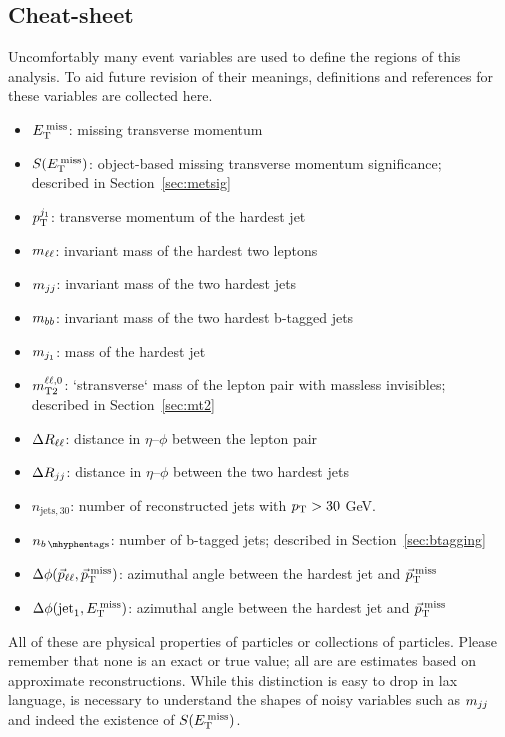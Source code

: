 \subsection{Cheat-sheet}
Uncomfortably many event variables are used to define the regions of this
analysis.
To aid future revision of their meanings, definitions and references for these
variables are collected here.
\begin{itemize}
\item $E_\mathrm{T}^\mathrm{\:miss}$: missing transverse momentum
\item $S(E_\mathrm{T}^\mathrm{\:miss})$: object-based missing transverse momentum significance;\\
described in Section~\ref{sec:metsig}
\item $p_\mathrm{T}^{j_1}$: transverse momentum of the hardest jet%
\vspace{0.5em}
\item $m_{\ell\ell}$: invariant mass of the hardest two leptons
\item $m_{jj}$: invariant mass of the two hardest jets
\item $m_{bb}$: invariant mass of the two hardest b-tagged jets
\item $m_{j_1}$: mass of the hardest jet
\item $m_\mathrm{T2}^{\ell\ell,0}$: `stransverse` mass of the lepton pair with massless invisibles;\\
described in Section~\ref{sec:mt2}
\vspace{0.5em}
\item $\Delta R_{\ell\ell}$: distance in $\eta\textrm{--}\phi$ between the lepton pair
\item $\Delta R_{jj}$: distance in $\eta\textrm{--}\phi$ between the two hardest jets%
\vspace{0.5em}
\item $n_{\mathrm{jets},30}$: number of reconstructed jets with $p_\mathrm{T} > 30$ GeV.
\item $\nbtag$: number of b-tagged jets;
described in Section~\ref{sec:btagging}
\vspace{0.5em}
\item $\Delta\phi(\vec p_{\ell\ell}, \vec p_\mathrm{T}^\mathrm{\:miss})$: azimuthal angle between the hardest jet and $\vec p_\mathrm{T}^\mathrm{\:miss}$
\item $\Delta\phi(\mathrm{jet}_1,E_\mathrm{T}^\mathrm{\:miss})$: azimuthal angle between
the hardest jet and $\vec p_\mathrm{T}^\mathrm{\:miss}$
\end{itemize}
All of these are physical properties of particles or collections of particles.
Please remember that none is an exact or true value;
all are are estimates based on approximate reconstructions.
While this distinction is easy to drop in lax language, is necessary to
understand the shapes of noisy variables such as $m_{jj}$ and indeed the
existence of $S(E_\mathrm{T}^\mathrm{\:miss})$.


